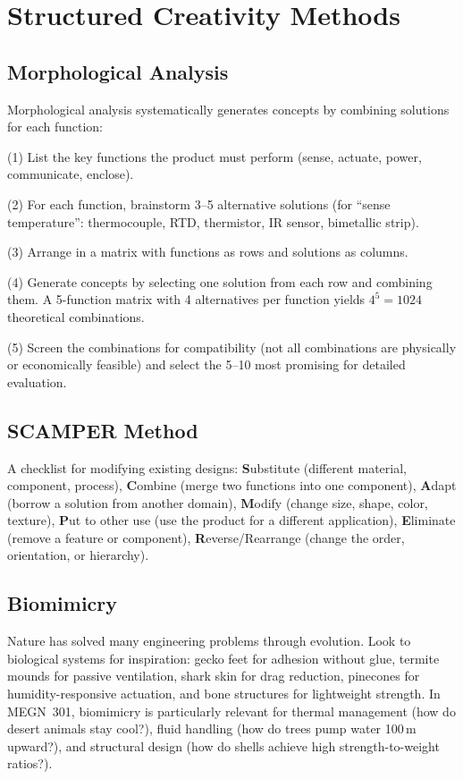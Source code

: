 \documentclass[11pt,letterpaper,twoside,openany]{book}
\begin{document}
\section{Structured Creativity Methods}
\subsection{Morphological Analysis}
Morphological analysis systematically generates concepts by combining solutions for each function:

(1) List the key functions the product must perform (sense, actuate, power, communicate, enclose).

(2) For each function, brainstorm 3--5 alternative solutions (for ``sense temperature'': thermocouple, RTD, thermistor, IR sensor, bimetallic strip).

(3) Arrange in a matrix with functions as rows and solutions as columns.

(4) Generate concepts by selecting one solution from each row and combining them. A 5-function matrix with 4 alternatives per function yields $4^5 = 1024$ theoretical combinations.

(5) Screen the combinations for compatibility (not all combinations are physically or economically feasible) and select the 5--10 most promising for detailed evaluation.

\subsection{SCAMPER Method}
A checklist for modifying existing designs: \textbf{S}ubstitute (different material, component, process), \textbf{C}ombine (merge two functions into one component), \textbf{A}dapt (borrow a solution from another domain), \textbf{M}odify (change size, shape, color, texture), \textbf{P}ut to other use (use the product for a different application), \textbf{E}liminate (remove a feature or component), \textbf{R}everse/Rearrange (change the order, orientation, or hierarchy).

\subsection{Biomimicry}
Nature has solved many engineering problems through evolution. Look to biological systems for inspiration: gecko feet for adhesion without glue, termite mounds for passive ventilation, shark skin for drag reduction, pinecones for humidity-responsive actuation, and bone structures for lightweight strength. In MEGN~301, biomimicry is particularly relevant for thermal management (how do desert animals stay cool?), fluid handling (how do trees pump water 100\,m upward?), and structural design (how do shells achieve high strength-to-weight ratios?).
\end{document}

